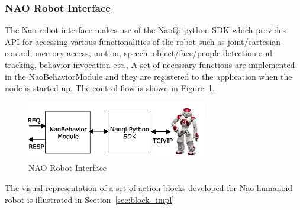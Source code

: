 \subsubsection{NAO Robot Interface}
\label{sssec:nao_interface}
The Nao robot interface makes use of the NaoQi python SDK which provides API for accessing various functionalities of the robot such as joint/cartesian control, memory access, motion, speech, object/face/people detection and tracking, behavior invocation etc., A set of necessary functions are implemented in the NaoBehaviorModule and they are registered to the application when the node is started up. The control flow is shown in Figure~\ref{fig:nao_interface}.
\begin{figure}[H]
\centering
\includegraphics[width=0.7\textwidth]{assets/NaoBehaviorModule.eps}
\caption[NAO Robot Interface]{NAO Robot Interface}
\label{fig:nao_interface}
\end{figure}
The visual representation of a set of action blocks developed for Nao humanoid robot is illustrated in Section~\ref{sec:block_impl}
